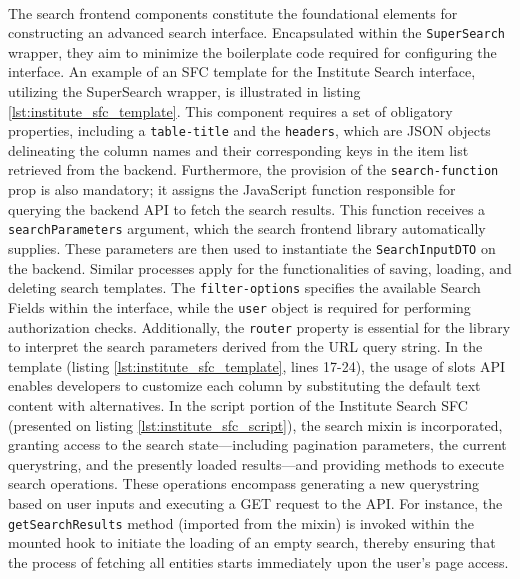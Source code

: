 \paragraph{} The search frontend components constitute the foundational elements for constructing an advanced search interface. Encapsulated within the \verb|SuperSearch| wrapper, they aim to minimize the boilerplate code required for configuring the interface. An example of an SFC template for the Institute Search interface, utilizing the SuperSearch wrapper, is illustrated in listing \ref{lst:institute_sfc_template}. This component requires a set of obligatory properties, including a \verb|table-title| and the \verb|headers|, which are JSON objects delineating the column names and their corresponding keys in the item list retrieved from the backend. Furthermore, the provision of the \verb|search-function| prop is also mandatory; it assigns the JavaScript function responsible for querying the backend API to fetch the search results. This function receives a \verb|searchParameters| argument, which the search frontend library automatically supplies. These parameters are then used to instantiate the \verb|SearchInputDTO| on the backend. Similar processes apply for the functionalities of saving, loading, and deleting search templates. The \verb|filter-options| specifies the available Search Fields within the interface, while the \verb|user| object is required for performing authorization checks. Additionally, the \verb|router| property is essential for the library to interpret the search parameters derived from the URL query string. In the template (listing \ref{lst:institute_sfc_template}, lines 17-24), the usage of slots API enables developers to customize each column by substituting the default text content with alternatives. In the script portion of the Institute Search SFC (presented on listing  \ref{lst:institute_sfc_script}), the search mixin is incorporated, granting access to the search state—including pagination parameters, the current querystring, and the presently loaded results—and providing methods to execute search operations. These operations encompass generating a new querystring based on user inputs and executing a GET request to the API. For instance, the \verb|getSearchResults| method (imported from the mixin) is invoked within the mounted hook to initiate the loading of an empty search, thereby ensuring that the process of fetching all entities starts immediately upon the user's page access.

